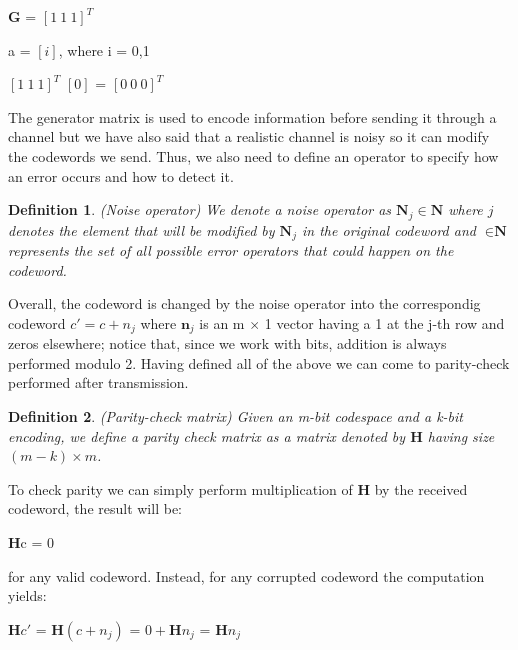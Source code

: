 \documentclass{Configuration_Files/PoliMi3i_thesis}
\newtheorem{definition}{Definition}[chapter]
\begin{document}
\begin{center}
	\textbf{G} = $[1 \ 1 \ 1]^{T}$  
\end{center}
\begin{center}
	a = $[i]$, where i = 0,1 
\end{center}
\begin{center}
	$[1 \ 1 \ 1]^{T}$ $[0]$ = $[0 \ 0 \ 0]^{T}$
\end{center}

The { generator matrix} is used to encode information before sending it through a channel but we have also said that a realistic channel is noisy so it can modify the codewords we send. Thus, we also need to define an operator to specify how an error occurs and how to detect it. 

\begin{definition}(Noise operator)
	We denote a noise operator as $\textbf{N}_j \in \textbf{N}$ where $j$ denotes the element that will be modified by $\textbf{N}_j$ in the original codeword and $\in \textbf{N}$  represents the set of all possible error operators that could happen on the codeword. 
\end{definition} 

Overall, the codeword is changed by the noise operator into the correspondig codeword $c' =c + n_j$ where $\textbf{n}_j$ is an m $\times$ 1 vector having a 1 at the j-th row and zeros elsewhere; notice that, since we work with bits, addition is always performed modulo 2.\newline
Having defined all of the above we can come to parity-check performed after transmission.

\begin{definition}(Parity-check matrix)
	Given an m-bit codespace and a k-bit encoding, we define a parity check matrix as a matrix denoted by $\textbf{H}$ having size $(m - k)\times m $.
\end{definition}

To check parity we can simply perform multiplication of {\bf H} by the received codeword, the result will be: 

\begin{center}
	\textbf{H}c = 0  
\end{center}

for any valid codeword. Instead, for any corrupted codeword the computation yields:

\begin{center}
	$\textbf{H}c'$ = $\textbf{H} ( c + n_j )$ = $0 + \textbf{H} n_j $  = $\textbf{H}n_j $ 
\end{center}
\end{document}
